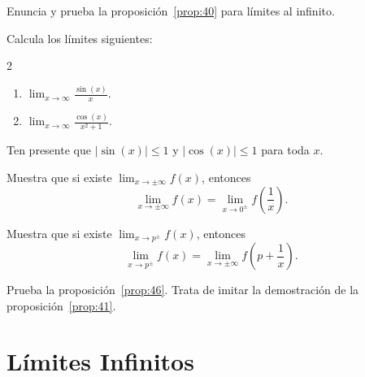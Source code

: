 \documentclass[12pt,a4paper]{book}
\begin{document}
    \begin{ejercicio}\label{ej:165}
        Enuncia y prueba la proposición~\ref{prop:40} para límites al infinito.
    \end{ejercicio}

    \begin{ejercicio}\label{ej:166}
        Calcula los límites siguientes:
        \begin{multicols}{2}
        \begin{enumerate}[nosep]
            \item $\lim_{x\to\infty}\frac{\sin(x)}{x}$.
            \item $\lim_{x\to\infty}\frac{\cos(x)}{x^{2}+1}$.
        \end{enumerate}
        \end{multicols}
        \sugerencia Ten presente que $|\sin(x)|\leq 1$ y $|\cos(x)|\leq 1$ para toda $x$.
    \end{ejercicio}

    \begin{ejercicio}\label{ej:167}
        Muestra que
        si existe $\lim_{x\to\pm\infty}f(x)$, entonces
        \begin{equation*}
            \lim_{x\to\pm\infty}f(x)=\lim_{x\to 0^{\pm}}f\left(\frac{1}{x}\right).
        \end{equation*}
    \end{ejercicio}

    \begin{ejercicio}\label{ej:168}
        Muestra que
        si existe $\lim_{x\to p^{\pm}}f(x)$, entonces
        \begin{equation*}
            \lim_{x\to p^{\pm}}f(x)=\lim_{x\to\pm\infty}f\left(p+\frac{1}{x}\right).
        \end{equation*}
    \end{ejercicio}

    \begin{ejercicio}\label{ej:169}
        Prueba la proposición~\ref{prop:46}. \sugerencia Trata de imitar la
        demostración de la proposición~\ref{prop:41}.
    \end{ejercicio}

    \section{Límites Infinitos}\label{sec:limites-infinitos}
\end{document}
